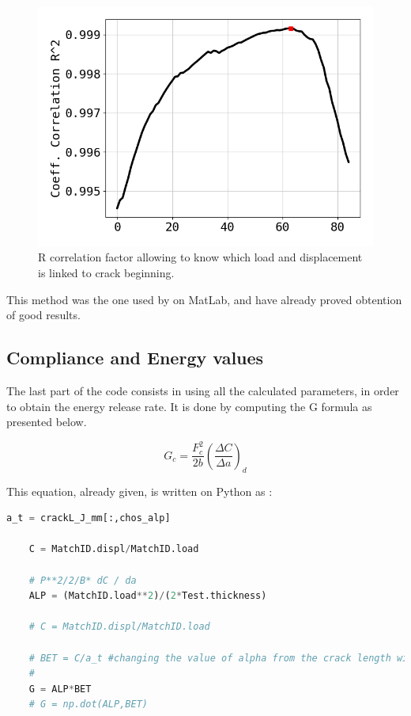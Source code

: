 \begin{figure}[h]
	\centering
	\includegraphics[scale=0.3]{Figures/Correlation_factor}
	\decoRule
	\caption[R correlation factor]{R correlation factor allowing to know which load and displacement is linked to crack beginning.}
	\label{fig:Fig12}
\end{figure}

This method was the one used by \parencite{Reference14} on MatLab, and have already proved obtention of good results.

\subsection{Compliance and Energy values}

The last part of the code consists in using all the calculated parameters, in order to obtain the energy release rate. It is done by computing the G formula as presented below.

\begin{equation}
	G_{c}= \frac{F_{c}^2}{2b} (\frac{\Delta C}{\Delta a})_{d} 	
	\label{eq:Energy release rate equation}
\end{equation}

This equation, already given, is written on Python as :

\begin{lstlisting}[language=Python]
	a_t = crackL_J_mm[:,chos_alp]
	
	C = MatchID.displ/MatchID.load
	
	# P**2/2/B* dC / da
	ALP = (MatchID.load**2)/(2*Test.thickness)
	
	# C = MatchID.displ/MatchID.load
	
	# BET = C/a_t #changing the value of alpha from the crack length will change G values
	#
	G = ALP*BET
	# G = np.dot(ALP,BET)
\end{lstlisting}

